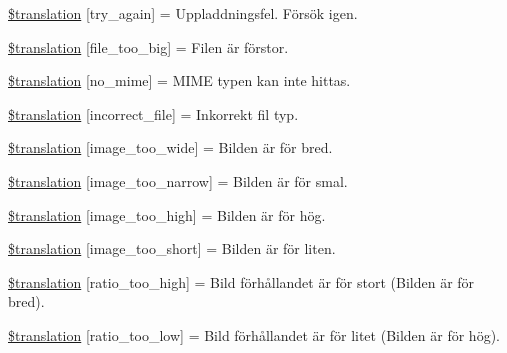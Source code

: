 \begin{DoxyCompactItemize}
\item 
\hyperlink{class_8upload_8sv___s_e_8php_a3afc377bd803683314f413a814243066}{\$translation} \mbox{[}\textquotesingle{}try\+\_\+again\textquotesingle{}\mbox{]} = \textquotesingle{}Uppladdningsfel. Försök igen.\textquotesingle{}
\item 
\hyperlink{class_8upload_8sv___s_e_8php_a476278eb4a0c3df56af068e2d511a741}{\$translation} \mbox{[}\textquotesingle{}file\+\_\+too\+\_\+big\textquotesingle{}\mbox{]} = \textquotesingle{}Filen är förstor.\textquotesingle{}
\item 
\hyperlink{class_8upload_8sv___s_e_8php_a191a55df8e3bb7f3c51b70f3c1932e02}{\$translation} \mbox{[}\textquotesingle{}no\+\_\+mime\textquotesingle{}\mbox{]} = \textquotesingle{}M\+I\+M\+E typen kan inte hittas.\textquotesingle{}
\item 
\hyperlink{class_8upload_8sv___s_e_8php_a4d32343e2699edd6fd435f9c832cb9c7}{\$translation} \mbox{[}\textquotesingle{}incorrect\+\_\+file\textquotesingle{}\mbox{]} = \textquotesingle{}Inkorrekt fil typ.\textquotesingle{}
\item 
\hyperlink{class_8upload_8sv___s_e_8php_a0dd3e4930ca1f59ae280f4b1006525cd}{\$translation} \mbox{[}\textquotesingle{}image\+\_\+too\+\_\+wide\textquotesingle{}\mbox{]} = \textquotesingle{}Bilden är för bred.\textquotesingle{}
\item 
\hyperlink{class_8upload_8sv___s_e_8php_a5c9a4cd67fd21c32e0a3b434591a6037}{\$translation} \mbox{[}\textquotesingle{}image\+\_\+too\+\_\+narrow\textquotesingle{}\mbox{]} = \textquotesingle{}Bilden är för smal.\textquotesingle{}
\item 
\hyperlink{class_8upload_8sv___s_e_8php_aa27bde361343f3b63c7cd441860024f8}{\$translation} \mbox{[}\textquotesingle{}image\+\_\+too\+\_\+high\textquotesingle{}\mbox{]} = \textquotesingle{}Bilden är för hög.\textquotesingle{}
\item 
\hyperlink{class_8upload_8sv___s_e_8php_a86fcd4e1157b00032df451188d735527}{\$translation} \mbox{[}\textquotesingle{}image\+\_\+too\+\_\+short\textquotesingle{}\mbox{]} = \textquotesingle{}Bilden är för liten.\textquotesingle{}
\item 
\hyperlink{class_8upload_8sv___s_e_8php_a23396f6ce7f31e5e5f1b57580621d982}{\$translation} \mbox{[}\textquotesingle{}ratio\+\_\+too\+\_\+high\textquotesingle{}\mbox{]} = \textquotesingle{}Bild förhållandet är för stort (Bilden är för bred).\textquotesingle{}
\item 
\hyperlink{class_8upload_8sv___s_e_8php_ac533b9a479f056b0b8623e4268f068c2}{\$translation} \mbox{[}\textquotesingle{}ratio\+\_\+too\+\_\+low\textquotesingle{}\mbox{]} = \textquotesingle{}Bild förhållandet är för litet (Bilden är för hög).\textquotesingle{}

\end{DoxyCompactItemize}
